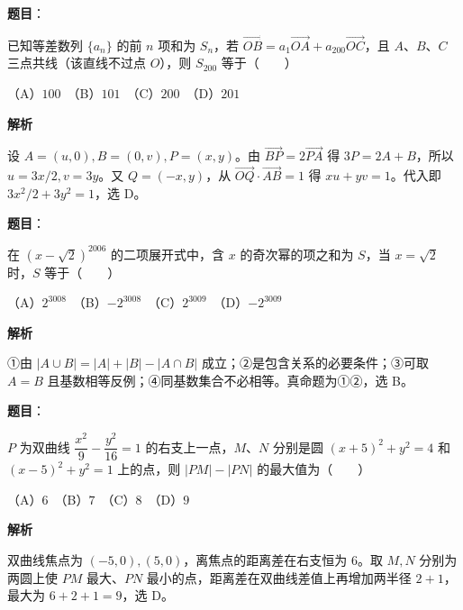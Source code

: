 \begin{answer}

\textbf{题目}：

已知等差数列 $\{a_n\}$ 的前 $n$ 项和为 $S_n$，若 $\overrightarrow{OB}=a_1\overrightarrow{OA}+a_{200}\overrightarrow{OC}$，且 $A\text{、}B\text{、}C$ 三点共线（该直线不过点 $O$），则 $S_{200}$ 等于\mbox{（　　）}

（A）$100$　（B）$101$　（C）$200$　（D）$201$

\textbf{解析}

设 $A=(u,0),B=(0,v),P=(x,y)$。由 $\overrightarrow{BP}=2\overrightarrow{PA}$ 得 $3P=2A+B$，所以 $u=3x/2,v=3y$。又 $Q=(-x,y)$，从 $\overrightarrow{OQ}\cdot\overrightarrow{AB}=1$ 得 $xu+yv=1$。代入即 $3x^2/2+3y^2=1$，选 D。


\end{answer}
\begin{answer}

\textbf{题目}：

在 $(x-\sqrt2)^{2006}$ 的二项展开式中，含 $x$ 的奇次幂的项之和为 $S$，当 $x=\sqrt2$ 时，$S$ 等于\mbox{（　　）}

（A）$2^{3008}$　（B）$-2^{3008}$　（C）$2^{3009}$　（D）$-2^{3009}$

\textbf{解析}

①由 $|A\cup B|=|A|+|B|-|A\cap B|$ 成立；②是包含关系的必要条件；③可取 $A=B$ 且基数相等反例；④同基数集合不必相等。真命题为①②，选 B。


\end{answer}
\begin{answer}

\textbf{题目}：

$P$ 为双曲线 $\dfrac{x^2}{9}-\dfrac{y^2}{16}=1$ 的右支上一点，$M\text{、}N$ 分别是圆 $(x+5)^2+y^2=4$ 和 $(x-5)^2+y^2=1$ 上的点，则 $|PM|-|PN|$ 的最大值为\mbox{（　　）}

（A）$6$　（B）$7$　（C）$8$　（D）$9$

\textbf{解析}

双曲线焦点为 $(-5,0),(5,0)$，离焦点的距离差在右支恒为 $6$。取 $M,N$ 分别为两圆上使 $PM$ 最大、$PN$ 最小的点，距离差在双曲线差值上再增加两半径 $2+1$，最大为 $6+2+1=9$，选 D。


\end{answer}
